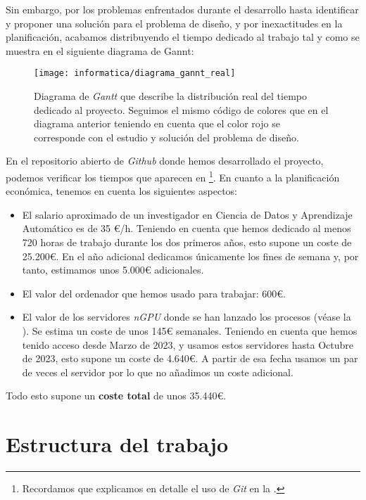 Sin embargo, por los problemas enfrentados durante el desarrollo hasta identificar y proponer una solución para el problema de diseño, y por inexactitudes en la planificación, acabamos distribuyendo el tiempo dedicado al trabajo tal y como se muestra en el siguiente diagrama de Gannt:

\begin{figure}[H]
	\centering
	\texttt{[image: informatica/diagrama\_gannt\_real]}
	\caption{Diagrama de \textit{Gantt} que describe la distribución real del tiempo dedicado al proyecto. Seguimos el mismo código de colores que en el diagrama anterior teniendo en cuenta que el color rojo se corresponde con el estudio y solución del problema de diseño.}
	\label{img:gannt_real}
\end{figure}

En el repositorio abierto de \textit{Github} \cite{informatica:repogithub} donde hemos desarrollado el proyecto, podemos verificar los tiempos que aparecen en  \footnote{Recordamos que explicamos en detalle el uso de \textit{Git} en la .}. En cuanto a la planificación económica, tenemos en cuenta los siguientes aspectos:

\begin{itemize}
	\item El salario aproximado de un investigador en Ciencia de Datos y Aprendizaje Automático es de 35 €/h. Teniendo en cuenta que hemos dedicado al menos 720 horas de trabajo durante los dos primeros años, esto supone un coste de 25.200€. En el año adicional dedicamos únicamente los fines de semana y, por tanto, estimamos unos 5.000€ adicionales.
	\item El valor del ordenador que hemos usado para trabajar: 600€.
	\item El valor de los servidores \textit{nGPU} donde se han lanzado los procesos (véase la ). Se estima un coste de unos 145€ semanales. Teniendo en cuenta que hemos tenido acceso desde Marzo de 2023, y usamos estos servidores hasta Octubre de 2023, esto supone un coste de 4.640€. A partir de esa fecha usamos un par de veces el servidor por lo que no añadimos un coste adicional.
\end{itemize}

Todo esto supone un \textbf{coste total} de unos 35.440€.

\section{Estructura del trabajo}

